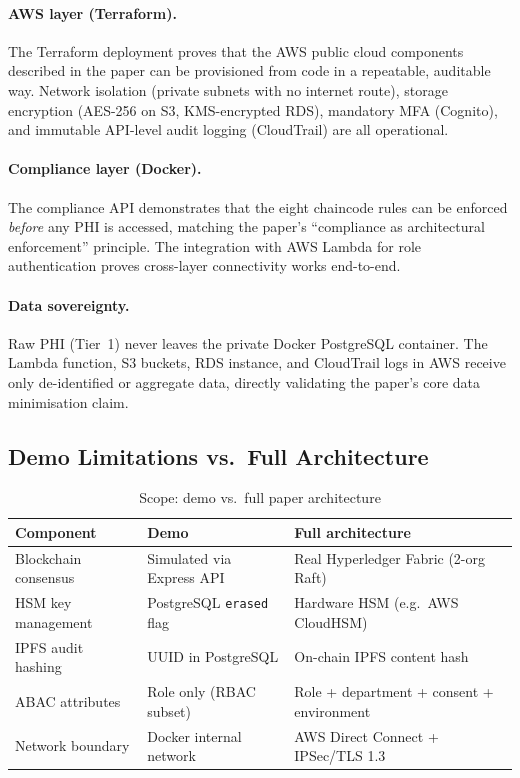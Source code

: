 \documentclass[12pt,a4paper]{article}
\begin{document}
\paragraph{AWS layer (Terraform).}
The Terraform deployment proves that the AWS public cloud components described in
the paper can be provisioned from code in a repeatable, auditable way. Network
isolation (private subnets with no internet route), storage encryption (AES-256 on
S3, KMS-encrypted RDS), mandatory MFA (Cognito), and immutable API-level audit
logging (CloudTrail) are all operational.

\paragraph{Compliance layer (Docker).}
The compliance API demonstrates that the eight chaincode rules can be enforced
\emph{before} any PHI is accessed, matching the paper's ``compliance as architectural
enforcement'' principle. The integration with AWS Lambda for role authentication
proves cross-layer connectivity works end-to-end.

\paragraph{Data sovereignty.}
Raw PHI (Tier~1) never leaves the private Docker PostgreSQL container. The Lambda
function, S3 buckets, RDS instance, and CloudTrail logs in AWS receive only
de-identified or aggregate data, directly validating the paper's core data
minimisation claim.

\subsection{Demo Limitations vs.\ Full Architecture}

\begin{table}[H]
\centering
\caption{Scope: demo vs.\ full paper architecture}
\begin{tabularx}{\textwidth}{@{}lXX@{}}
\toprule
\textbf{Component} & \textbf{Demo} & \textbf{Full architecture} \\
\midrule
Blockchain consensus & Simulated via Express API & Real Hyperledger Fabric (2-org Raft) \\
HSM key management   & PostgreSQL \texttt{erased} flag & Hardware HSM (e.g.\ AWS CloudHSM) \\
IPFS audit hashing   & UUID in PostgreSQL & On-chain IPFS content hash \\
ABAC attributes      & Role only (RBAC subset) & Role + department + consent + environment \\
Network boundary     & Docker internal network & AWS Direct Connect + IPSec/TLS 1.3 \\
\bottomrule
\end{tabularx}
\end{table}
\end{document}
